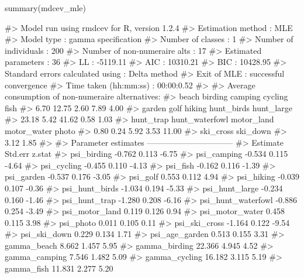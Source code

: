 \begin{Schunk}
\begin{Sinput}
summary(mdcev_mle)
\end{Sinput}
\begin{Soutput}
#> Model run using rmdcev for R, version 1.2.4 
#> Estimation method                : MLE
#> Model type                       : gamma specification
#> Number of classes                : 1
#> Number of individuals            : 200
#> Number of non-numeraire alts     : 17
#> Estimated parameters             : 36
#> LL                               : -5119.11
#> AIC                              : 10310.21
#> BIC                              : 10428.95
#> Standard errors calculated using : Delta method
#> Exit of MLE                      : successful convergence
#> Time taken (hh:mm:ss)            : 00:00:0.52
#> 
#> Average consumption of non-numeraire alternatives:
#>          beach        birding        camping        cycling           fish 
#>           6.70          12.75           2.60           7.89           4.00 
#>         garden           golf         hiking     hunt_birds     hunt_large 
#>          23.18           5.42          41.62           0.58           1.03 
#>      hunt_trap hunt_waterfowl     motor_land    motor_water          photo 
#>           0.80           0.24           5.92           3.53          11.00 
#>      ski_cross       ski_down 
#>           3.12           1.85 
#> 
#> Parameter estimates --------------------------------  
#>                      Estimate Std.err z.stat
#> psi_birding            -0.762   0.113  -6.75
#> psi_camping            -0.534   0.115  -4.64
#> psi_cycling            -0.455   0.110  -4.13
#> psi_fish               -0.162   0.116  -1.39
#> psi_garden             -0.537   0.176  -3.05
#> psi_golf                0.553   0.112   4.94
#> psi_hiking             -0.039   0.107  -0.36
#> psi_hunt_birds         -1.034   0.194  -5.33
#> psi_hunt_large         -0.234   0.160  -1.46
#> psi_hunt_trap          -1.280   0.208  -6.16
#> psi_hunt_waterfowl     -0.886   0.254  -3.49
#> psi_motor_land          0.119   0.126   0.94
#> psi_motor_water         0.458   0.115   3.98
#> psi_photo               0.011   0.105   0.11
#> psi_ski_cross          -1.164   0.122  -9.54
#> psi_ski_down            0.229   0.134   1.71
#> psi_age_garden          0.513   0.155   3.31
#> gamma_beach             8.662   1.457   5.95
#> gamma_birding          22.366   4.945   4.52
#> gamma_camping           7.546   1.482   5.09
#> gamma_cycling          16.182   3.115   5.19
#> gamma_fish             11.831   2.277   5.20

\end{Soutput}
\end{Schunk}
